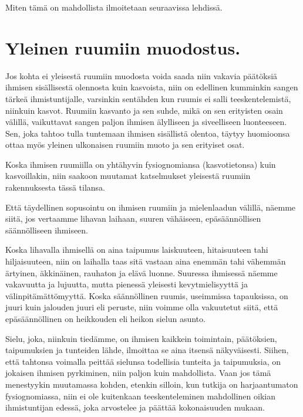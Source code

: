 \documentclass[11pt, twoside, finnish, a5paper]{book}
\begin{document}
Miten tämä on mahdollista ilmoitetaan seuraavissa lehdissä.
\endgroup



\begingroup

\chapter*{Yleinen ruumiin muodostus.}

Jos kohta ei yleisestä ruumiin muodosta voida saada
niin vakavia päätöksiä ihmisen sisällisestä olennosta kuin
kasvoista, niin on edellinen kumminkin sangen tärkeä
ihmistuntijalle, varsinkin sentähden kun ruumis ei salli
teeskentelemistä, niinkuin kasvot. Ruumiin kasvanto
ja sen suhde, mikä on sen erityisten osain välillä,
vaikuttavat sangen paljon ihmisen älylliseen ja siveelliseen
luonteeseen. Sen, joka tahtoo tulla tuntemaan ihmisen
sisällistä olentoa, täytyy huomioonsa ottaa myös yleinen
ulkonaisen ruumiin muoto ja sen erityiset osat.

Koska ihmisen ruumiilla on yhtähyvin fysiognomiansa
(kasvotietonsa) kuin kasvoillakin, niin saakoon muutamat
katselmukset yleisestä ruumiin rakennuksesta tässä tilansa.

Että täydellinen sopusointu on ihmisen ruumiin ja mielenlaadun
välillä, näemme siitä, jos vertaamme lihavan
laihaan, suuren vähäiseen, epäsäännöllisen säännölliseen ihmiseen.

Koska lihavalla ihmisellä on aina taipumus laiskuuteen,
hitaisuuteen tahi hiljaisuuteen, niin on laihalla taas sitä
vastaan aina enemmän tahi vähemmän ärtyinen, äkkinäinen,
rauhaton ja elävä luonne. Suuressa ihmisessä näemme
vakavuutta ja lujuutta, mutta pienessä yleisesti
kevytmielisyyttä ja välinpitämättömyyttä. Koska säännöllinen
ruumis, useimmissa tapauksissa, on juuri kuin jalouden
juuri eli peruste, niin voimme olla vakuutetut siitä,
että epäsäännöllinen on heikkouden eli heikon sielun asunto.

Sielu, joka, niinkuin tiedämme, on ihmisen kaikkein
toimintain, päätöksien, taipumuksien ja tunteiden lähde,
ilmoittaa se aina itsensä näkyväisesti.
Siihen, että tahtonsa voimalla peittää
sielunsa todellisia tunteita ja taipumuksia,
on jokaisen ihmisen pyrkiminen, niin paljon
kuin mahdollista. Vaan jos tämä menestyykin muutamassa
kohden, etenkin silloin, kun tutkija on harjaantumaton
fysiognomiassa, niin ei ole kuitenkaan teeskenteleminen
mahdollinen oikian ihmistuntijan edessä, joka
arvostelee ja päättää kokonaisuuden mukaan.
\end{document}

